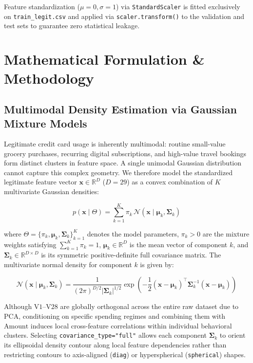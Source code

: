 \documentclass[11pt, a4paper]{article}
\begin{document}
Feature standardization ($\mu = 0, \sigma = 1$) via \texttt{StandardScaler} is fitted exclusively on \texttt{train\_legit.csv} and applied via \texttt{scaler.transform()} to the validation and test sets to guarantee zero statistical leakage.

\section{Mathematical Formulation \& Methodology}

\subsection{Multimodal Density Estimation via Gaussian Mixture Models}
Legitimate credit card usage is inherently multimodal: routine small-value grocery purchases, recurring digital subscriptions, and high-value travel bookings form distinct clusters in feature space. A single unimodal Gaussian distribution cannot capture this complex geometry. We therefore model the standardized legitimate feature vector $\mathbf{x} \in \mathbb{R}^{D}$ ($D = 29$) as a convex combination of $K$ multivariate Gaussian densities:

\begin{equation}
p(\mathbf{x} \mid \Theta) = \sum_{k=1}^{K} \pi_k \, \mathcal{N}(\mathbf{x} \mid \boldsymbol{\mu}_k, \boldsymbol{\Sigma}_k)
\end{equation}

where $\Theta = \{\pi_k, \boldsymbol{\mu}_k, \boldsymbol{\Sigma}_k\}_{k=1}^{K}$ denotes the model parameters, $\pi_k > 0$ are the mixture weights satisfying $\sum_{k=1}^{K} \pi_k = 1$, $\boldsymbol{\mu}_k \in \mathbb{R}^{D}$ is the mean vector of component $k$, and $\boldsymbol{\Sigma}_k \in \mathbb{R}^{D \times D}$ is its symmetric positive-definite full covariance matrix. The multivariate normal density for component $k$ is given by:

\begin{equation}
\mathcal{N}(\mathbf{x} \mid \boldsymbol{\mu}_k, \boldsymbol{\Sigma}_k) = \frac{1}{(2\pi)^{D/2} |\boldsymbol{\Sigma}_k|^{1/2}} \exp \left( -\frac{1}{2} (\mathbf{x} - \boldsymbol{\mu}_k)^{\top} \boldsymbol{\Sigma}_k^{-1} (\mathbf{x} - \boldsymbol{\mu}_k) \right)
\end{equation}

Although $\text{V1}$--$\text{V28}$ are globally orthogonal across the entire raw dataset due to PCA, conditioning on specific spending regimes and combining them with $\text{Amount}$ induces local cross-feature correlations within individual behavioral clusters. Selecting \texttt{covariance\_type="full"} allows each component $\boldsymbol{\Sigma}_k$ to orient its ellipsoidal density contour along local feature dependencies rather than restricting contours to axis-aligned (\texttt{diag}) or hyperspherical (\texttt{spherical}) shapes.
\end{document}
